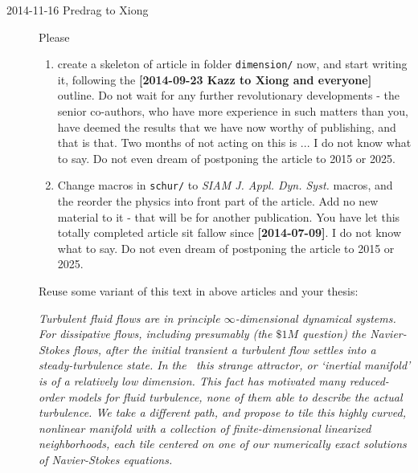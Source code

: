 \begin{description}
\item[2014-11-16 Predrag to Xiong] Please
\begin{enumerate}
\item create a skeleton of article  in folder
\texttt{dimension/} now, and start writing it, following the {\bf
[2014-09-23 Kazz to Xiong and everyone]} outline. Do not wait for any
further revolutionary developments - the senior co-authors, who have more
experience in such matters than you, have deemed the results that we have
now worthy of publishing, and that is that. Two months of not acting on
this is ... I do not know what to say. Do not even dream of postponing
the article to 2015 or 2025.
\item Change macros in \texttt{schur/} to {\em SIAM J. Appl. Dyn. Syst.}
macros, and the reorder the physics into front part of the article. Add
no new material to it - that will be for another publication. You have
let this totally completed article sit fallow since {\bf [2014-07-09]}. I
do not know what to say. Do not even dream of postponing the article to
2015 or 2025.
\end{enumerate}

Reuse some variant of this text in above articles and your thesis:

{\em Turbulent fluid flows are in principle $\infty$-dimensional
dynamical systems. For dissipative flows, including presumably (the
$\$1M$ question) the Navier-Stokes flows, after the initial transient a
turbulent flow settles into a steady-turbulence state. In the \statesp\
this strange attractor, or `inertial manifold' is of a 	relatively low
dimension. This fact has motivated many 	reduced-order models for
fluid turbulence, none of them able to describe the actual turbulence. We
take a different path, and propose to tile this highly curved, nonlinear
manifold with a collection of finite-dimensional linearized
neighborhoods, each tile centered on one of our numerically exact
solutions of Navier-Stokes equations.
}


\end{description}

